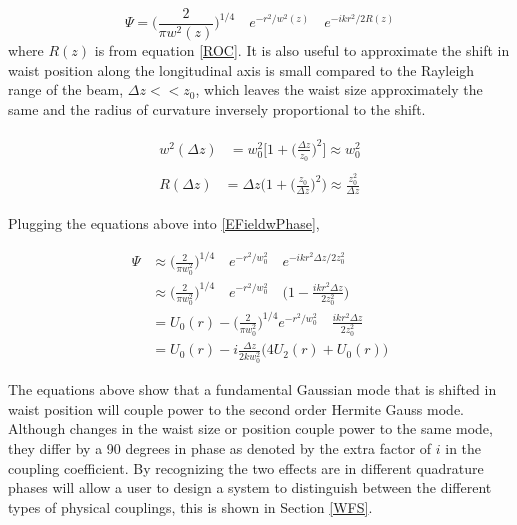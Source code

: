 \documentclass[oneside]{book}
\begin{document}
		\begin{equation}\label{EFieldwPhase}
		\Psi = 	\bigg( \frac{2}{\pi w^2(z)} \bigg)^{1/4} \quad e^{-r^2/w^2(z)} \quad e^{-ikr^2/2R(z)}
		\end{equation}
		where $R(z)$ is from equation \ref{ROC}.  It is also useful to approximate the shift in waist position along the longitudinal axis is small compared to the Rayleigh range of the beam, $\Delta z << z_0$, which leaves the waist size approximately the same and the radius of curvature inversely proportional to the shift. 
		
		\begin{subequations}
		\begin{align}
		\begin{split}
			w^2(\Delta z)	&= 	w^2_0 \bigg[1 + \bigg(\frac{\Delta z}{z_0}  \bigg)^2 \bigg]  \approx	w^2_0
		\end{split}\\
		\begin{split}
			R(\Delta z) 	&=	\Delta z \bigg(1 + \bigg(\frac{z_0}{\Delta z}\bigg)^2\bigg) \approx	\frac{z_0^2}{\Delta z}
		\end{split}
		\end{align}
		\end{subequations}

		Plugging the equations above into \ref{EFieldwPhase},
		
		\begin{equation}
		\begin{aligned}
		\Psi 	&\approx	\bigg( \frac{2}{\pi w_0^2} \bigg)^{1/4} \quad e^{-r^2/w_0^2} \quad e^{-ikr^2 \Delta z /2 z_0^2}
		\\		&\approx	\bigg( \frac{2}{\pi w_0^2} \bigg)^{1/4} \quad e^{-r^2/w_0^2} \quad \bigg( 1-\frac{ikr^2 \Delta z}{2 z_0^2}  \bigg)
		\\		&=			U_0(r) - \bigg( \frac{2}{\pi w_0^2} \bigg)^{1/4} e^{-r^2/w_0^2} \quad \frac{ikr^2 \Delta z}{2 z_0^2}
		\\		&=			U_0(r) - i \frac{\Delta z}{2k w_0^2} \bigg( 4U_2(r) + U_0(r) \bigg)
		\end{aligned}
		\end{equation}
		
		The equations above show that a fundamental Gaussian mode that is shifted in waist position will couple power to the second order Hermite Gauss mode.  Although changes in the waist size or position couple power to the same mode, they differ by a 90 degrees in phase as denoted by the extra factor of $i$ in the coupling coefficient.  By recognizing the two effects are in different quadrature phases will allow a user to design a system to distinguish between the different types of physical couplings, this is shown in Section \ref{WFS}.
		
\end{document}

